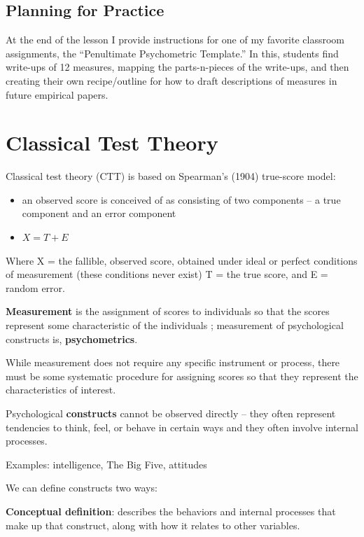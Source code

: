 \documentclass[
  english,
]{book}
\providecommand{\tightlist}{%
  \setlength{\itemsep}{0pt}\setlength{\parskip}{0pt}}
\begin{document}
\hypertarget{planning-for-practice}{%
\subsection{Planning for Practice}\label{planning-for-practice}}

At the end of the lesson I provide instructions for one of my favorite classroom assignments, the ``Penultimate Psychometric Template.'' In this, students find write-ups of 12 measures, mapping the parts-n-pieces of the write-ups, and then creating their own recipe/outline for how to draft descriptions of measures in future empirical papers.

\hypertarget{classical-test-theory}{%
\section{Classical Test Theory}\label{classical-test-theory}}

Classical test theory (CTT) is based on Spearman's (1904) true-score model:

\begin{itemize}
\tightlist
\item
  an observed score is conceived of as consisting of two components -- a true component and an error component
\item
  \(X = T + E\)
\end{itemize}

Where
X = the fallible, observed score, obtained under ideal or perfect conditions of measurement (these conditions never exist)
T = the true score, and
E = random error.

\textbf{Measurement} is the assignment of scores to individuals so that the scores represent some characteristic of the individuals \citep{jhangiani_research_2019}; measurement of psychological constructs is, \textbf{psychometrics}.

While measurement does not require any specific instrument or process, there must be some systematic procedure for assigning scores so that they represent the characteristics of interest.

Psychological \textbf{constructs} cannot be observed directly -- they often represent tendencies to think, feel, or behave in certain ways and they often involve internal processes.

Examples: intelligence, The Big Five, attitudes

We can define constructs two ways:

\textbf{Conceptual definition}: describes the behaviors and internal processes that make up that construct, along with how it relates to other variables.
\end{document}
